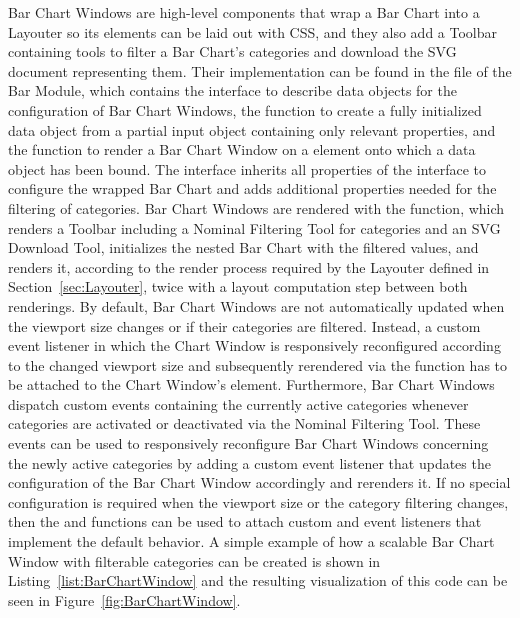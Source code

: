 Bar Chart Windows are high-level components that wrap a Bar Chart into a Layouter so its elements can be laid out with CSS, and they also add a Toolbar containing tools to filter a Bar Chart's categories and download the SVG document representing them.
Their implementation can be found in the  file of the Bar Module, which contains the  interface to describe data objects for the configuration of Bar Chart Windows, the  function to create a fully initialized  data object from a partial input object containing only relevant properties, and the  function to render a Bar Chart Window on a  element onto which a  data object has been bound.
The  interface inherits all properties of the  interface to configure the wrapped Bar Chart and adds additional properties needed for the filtering of categories.
Bar Chart Windows are rendered with the  function, which renders a Toolbar including a Nominal Filtering Tool for categories and an SVG Download Tool, initializes the nested Bar Chart with the filtered values, and renders it, according to the render process required by the Layouter defined in Section~\ref{sec:Layouter}, twice with a layout computation step between both renderings.
By default, Bar Chart Windows are not automatically updated when the viewport size changes or if their categories are filtered.
Instead, a custom  event listener in which the Chart Window is responsively reconfigured according to the changed viewport size and subsequently rerendered via the  function has to be attached to the Chart Window's element.
Furthermore, Bar Chart Windows dispatch custom  events containing the currently active categories whenever categories are activated or deactivated via the Nominal Filtering Tool.
These events can be used to responsively reconfigure Bar Chart Windows concerning the newly active categories by adding a custom  event listener that updates the configuration of the Bar Chart Window accordingly and rerenders it.
If no special configuration is required when the viewport size or the category filtering changes, then the  and  functions can be used to attach custom  and  event listeners that implement the default behavior.
A simple example of how a scalable Bar Chart Window with filterable categories can be created is shown in Listing~\ref{list:BarChartWindow} and the resulting visualization of this code can be seen in Figure~\ref{fig:BarChartWindow}.

